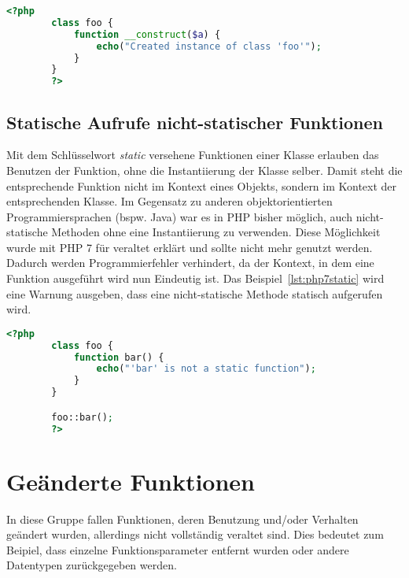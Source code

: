     \begin{lstlisting}[language=php, caption={Beispiel eines expliziten Konstruktors}, label={lst:php5construct}]
        <?php
        class foo {
            function __construct($a) {
                echo("Created instance of class 'foo'");
            }
        }
        ?>
    \end{lstlisting}
    
    \subsection{Statische Aufrufe nicht-statischer Funktionen}
    Mit dem Schlüsselwort \textit{static} versehene Funktionen einer Klasse erlauben das Benutzen der Funktion, ohne die 
    Instantiierung der Klasse selber. Damit steht die entsprechende Funktion nicht im Kontext eines Objekts, sondern 
    im Kontext der entsprechenden Klasse. Im Gegensatz zu anderen objektorientierten Programmiersprachen (bspw. Java) war es 
    in PHP bisher möglich, auch nicht-statische Methoden ohne eine Instantiierung zu verwenden. Diese Möglichkeit wurde mit
    PHP 7 für veraltet erklärt und sollte nicht mehr genutzt werden. Dadurch werden Programmierfehler verhindert, da der Kontext, in dem eine Funktion ausgeführt wird nun
    Eindeutig ist. Das Beispiel~\ref{lst:php7static} wird eine Warnung ausgeben, dass eine nicht-statische Methode statisch aufgerufen wird.
    \begin{lstlisting}[language=php, caption={Beispiel eines statischen Aufrufs einer nicht-satischen Funktion in PHP 7}, label={lst:php7static}]
        <?php
        class foo {
            function bar() {
                echo("'bar' is not a static function");
            }
        }

        foo::bar();
        ?>
    \end{lstlisting}

\section{Geänderte Funktionen}
In diese Gruppe fallen Funktionen, deren Benutzung und/oder Verhalten geändert wurden, allerdings nicht vollständig veraltet sind. Dies bedeutet zum Beipiel, dass 
einzelne Funktionsparameter entfernt wurden oder andere Datentypen zurückgegeben werden.
